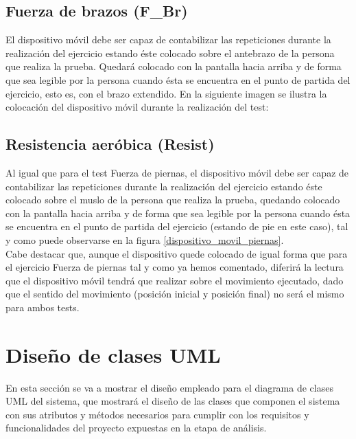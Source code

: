 
\subsection{Fuerza de brazos (F\_Br)}

El dispositivo móvil debe ser capaz de contabilizar las repeticiones durante la realización del ejercicio estando éste colocado sobre el antebrazo de la persona que realiza la prueba. Quedará colocado con la pantalla hacia arriba y de forma que sea legible por la persona cuando ésta se encuentra en el punto de partida del ejercicio, esto es, con el brazo extendido. En la siguiente imagen se ilustra la colocación del dispositivo móvil durante la realización del test:


\subsection{Resistencia aeróbica (Resist)}

Al igual que para el test Fuerza de piernas, el dispositivo móvil debe ser capaz de contabilizar las repeticiones durante la realización del ejercicio estando éste colocado sobre el muslo de la persona que realiza la prueba, quedando colocado con la pantalla hacia arriba y de forma que sea legible por la persona cuando ésta se encuentra en el punto de partida del ejercicio (estando de pie en este caso), tal y como puede observarse en la figura \ref{dispositivo_movil_piernas}.\\

Cabe destacar que, aunque el dispositivo quede colocado de igual forma que para el ejercicio Fuerza de piernas tal y como ya hemos comentado, diferirá la lectura que el dispositivo móvil tendrá que realizar sobre el movimiento ejecutado, dado que el sentido del movimiento (posición inicial y posición final) no será el mismo para ambos tests.

\section{Diseño de clases UML}

En esta sección se va a mostrar el diseño empleado para el diagrama de clases UML del sistema, que mostrará el diseño de las clases que componen el sistema con sus atributos y métodos necesarios para cumplir con los requisitos y funcionalidades del proyecto expuestas en la etapa de análisis.\\

